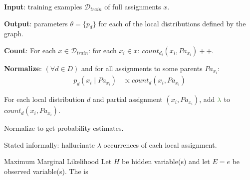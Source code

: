 \documentclass[11pt]{article}
\begin{document}
\begin{algorithm}
	\textbf{Input}: training examples $\mathcal D_{train}$ of full assignments $x$.
	
	\textbf{Output}: parameters $\theta = \{p_d\}$ for each of the local distributions defined by the graph.
	
	\begin{compactenum}
		\item 	\textbf{Count}: For each $x \in \mathcal D_{train}$: for each $x_i \in x$: $count_{d_i}(x_i, Pa_{x_i})++$. 
		
		\item \textbf{Normalize}: $(\forall d \in D)$ and for all assignments to some parents $Pa_{x_i}$: 
		\begin{align}
			p_d(x_i \mid Pa_{x_i}) &\propto count_d(x_i, Pa_{x_i})
		\end{align}
	\end{compactenum}

\end{algorithm}


\begin{algorithm}
	\begin{compactenum}
		\item For each local distribution $d$ and partial assignment $(x_i, Pa_{x_i})$, add $\mgreen{\lambda}$ to $count_d(x_i, Pa_{x_i})$. 
		
		\item Normalize to get probability estimates.
	\end{compactenum}

	Stated informally: hallucinate $\lambda$ occurrences of each local assignment.
	
\end{algorithm}

\begin{definition}{Maximum Marginal Likelihood }
	Let $H$ be hidden variable(s) and let $E=e$ be observed variable(s). The  is
\end{definition}
\end{document}
